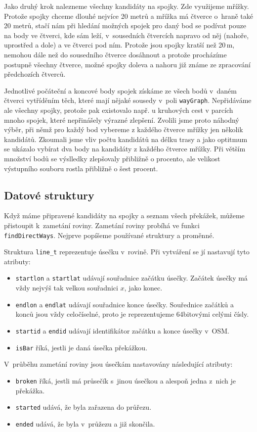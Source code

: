 Jako druhý krok nalezneme všechny kandidáty na spojky. Zde využijeme mřížky.
Protože spojky chceme dlouhé nejvíce 20 metrů a mřížka má čtverce o~hraně také
20 metrů, stačí nám při hledání možných spojek pro daný bod se podívat pouze na
body ve čtverci, kde sám leží, v~sousedních čtvercích napravo od něj (nahoře,
uprostřed a dole) a ve čtverci pod ním. Protože jsou spojky kratší než 20\,m,
nemohou dále než do sousedního čtverce dosáhnout a protože procházíme postupně
všechny čtverce, možné spojky doleva a nahoru již známe ze zpracování
předchozích čtverců. 

Jednotlivé počáteční a koncové body spojek získáme ze všech bodů v~daném čtverci
vytříděním těch, které mají nějaké sousedy v~poli \verb|wayGraph|. Nepřidáváme
ale všechny spojky, protože pak existovalo např. u kruhových cest v parcích
mnoho spojek, které nepřinášely výrazné zlepšení. Zvolili jsme proto náhodný
výběr, při němž pro každý bod vybereme z každého čtverce mřížky jen několik
kandidátů. Zkoumali jsme vliv počtu kandidátů na délku trasy a jako optitmum se
ukázalo vybírat dva body na kandidáty z každého čtverce mřížky. Při větším
množství bodů se výslledky zlepšovaly přibližně o procento, ale velikost
výstupního souboru rostla přibližně o šest procent.


\subsection{Datové struktury}
Když máme připravené kandidáty na spojky a seznam všech překážek, můžeme
přistoupit k~zametání roviny. Zametání roviny probíhá ve funkci
\verb|findDirectWays|. Nejprve popíšeme používané struktury a proměnné.

Struktura \verb|line_t| reprezentuje úsečku v~rovině. Při vytváření se jí
nastavují tyto atributy:
\begin{itemize}
	\item \verb|startlon| a \verb|startlat| udávají souřadnice začátku
	úsečky. Začátek úsečky má vždy nejvýš tak velkou souřadnici $x$, jako
	konec.
	\item \verb|endlon| a \verb|endlat| udávají souřadnice konce úsečky.
	Souřednice začátků a konců jsou vždy celočíselné, proto je
	reprezentujeme 64bitovými celými čísly.
	\item \verb|startid| a \verb|endid| udávají identifikátor začátku a
	konce úsečky v~OSM.
	\item \verb|isBar| říká, jestli je daná úsečka překážkou.
\end{itemize}
V~průběhu zametání roviny jsou úsečkám nastavovány následující atributy:
\begin{itemize}
	\item \verb|broken| říká, jestli má průsečík s~jinou úsečkou a alespoň
	jedna z~nich je překážka.
	\item \verb|started| udává, že byla zařazena do průřezu.
	\item \verb|ended| udává, že byla v~průžezu a již skončila.
\end{itemize}

